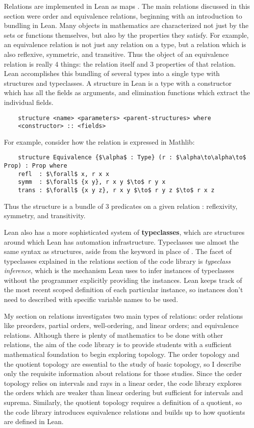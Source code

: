 Relations are implemented in Lean as maps . The 
main relations discussed in this section were order and equivalence relations,
beginning with an introduction to bundling in Lean. Many objects in 
mathematics are characterized not just by the sets or functions themselves,
but also by the properties they satisfy. For example, an equivalence relation
is not just any relation on a type, but a relation which is also reflexive, 
symmetric, and transitive. Thus the object of an equivalence relation is really
4 things: the relation itself and 3 properties of that relation. Lean accomplishes
this bundling of several types into a single type with structures and typeclasses.
A structure in Lean is a type with a constructor which has all the fields
as arguments, and elimination functions which extract the individual fields.
\begin{lstlisting}
    structure <name> <parameters> <parent-structures> where
    <constructor> :: <fields>
\end{lstlisting}
For example, consider how the  relation is expressed in Mathlib:
\begin{lstlisting}
    structure Equivalence {$\alpha$ : Type} (r : $\alpha\to\alpha\to$ Prop) : Prop where
    refl  : $\forall$ x, r x x
    symm  : $\forall$ {x y}, r x y $\to$ r y x
    trans : $\forall$ {x y z}, r x y $\to$ r y z $\to$ r x z
\end{lstlisting}
Thus the structure  is a bundle of 3 predicates on a given
relation : reflexivity, symmetry, and transitivity.

Lean also has a more sophisticated system of \textbf{typeclasses}, which are
structures around which Lean has automation infrastructure. Typeclasses use 
almost the same syntax as structures, aside from the keyword  in
place of . The facet of typeclasses explained in the relations
section of the code library is \textit{typeclass inference}, which is the
mechanism Lean uses to infer instances of typeclasses without the programmer
explicitly providing the instances. Lean keeps track of the most recent scoped 
definition of each particular instance, so instances don't need to described
with specific variable names to be used. 

My section on relations investigates two main types of relations: order relations like
preorders, partial orders, well-ordering, and linear orders; and equivalence relations. Although there is 
plenty of mathematics to be done with other relations, the aim of the code library is to
provide students with a sufficient mathematical foundation to begin exploring topology.
The order topology and the quotient topology are essential to the study of basic topology, 
so I describe only the requisite information about relations for those studies. Since the order 
topology relies on intervals and rays in a linear order, the code library explores the orders
which are weaker than linear ordering but sufficient for intervals and suprema. Similarly, 
the quotient topology requires a definition of a quotient, so the code library introduces equivalence
relations and builds up to how quotients are defined in Lean.

